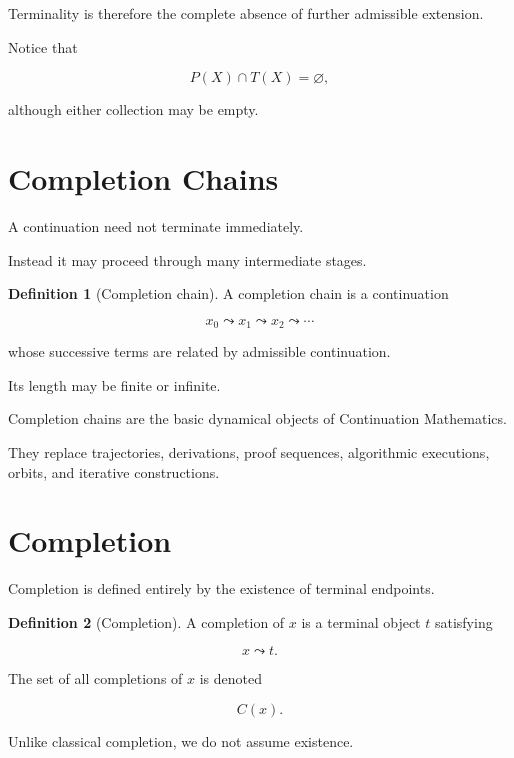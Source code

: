 \documentclass[13pt,openany]{book}
\theoremstyle{plain}
\theoremstyle{definition}
\newtheorem{definition}{Definition}[chapter]
\begin{document}
Terminality is therefore the complete absence of further admissible extension.

Notice that

\[
P(X)\cap T(X)=\varnothing,
\]

although either collection may be empty.


\section{Completion Chains}

A continuation need not terminate immediately.

Instead it may proceed through many intermediate stages.

\begin{definition}[Completion chain]
A completion chain is a continuation

\[
x_0
\leadsto
x_1
\leadsto
x_2
\leadsto
\cdots
\]

whose successive terms are related by admissible continuation.

Its length may be finite or infinite.
\end{definition}

Completion chains are the basic dynamical objects of Continuation Mathematics.

They replace trajectories, derivations,
proof sequences,
algorithmic executions,
orbits,
and iterative constructions.


\section{Completion}

Completion is defined entirely by the existence of terminal endpoints.

\begin{definition}[Completion]
A completion of $x$ is a terminal object $t$ satisfying

\[
x\leadsto t.
\]

The set of all completions of $x$ is denoted

\[
C(x).
\]
\end{definition}

Unlike classical completion,
we do not assume existence.
\end{document}
